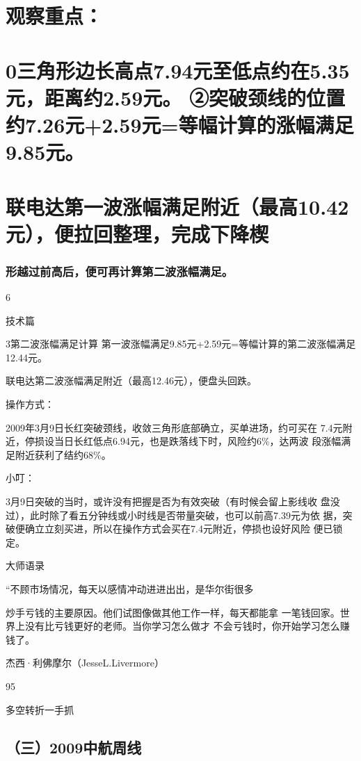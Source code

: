 \documentclass{article}
\begin{document}
\section{观察重点：}

\section{0三角形边长高点7.94元至低点约在5.35元，距离约2.59元。 ②突破颈线的位置约7.26元+2.59元=等幅计算的涨幅满足9.85元。}

\section{联电达第一波涨幅满足附近（最高10.42元），便拉回整理，完成下降楔}

\subsubsection{形越过前高后，便可再计算第二波涨幅满足。}

6

\clearpage

技术篇

3第二波涨幅满足计算 第一波涨幅满足9.85元+2.59元=等幅计算的第二波涨幅满足12.44元。

联电达第二波涨幅满足附近（最高12.46元），便盘头回跌。

操作方式：

2009年3月9日长红突破颈线，收敛三角形底部确立，买单进场，约可买在 7.4元附近，停损设当日长红低点6.94元，也是跌落线下时，风险约6\%，达两波 段涨幅满足附近获利了结约68\%。

小叮：

3月9日突破的当时，或许没有把握是否为有效突破（有时候会留上影线收 盘没过），此时除了看五分钟线或小时线是否带量突破，也可以前高7.39元为依 据，突破便确立立刻买进，所以在操作方式会买在7.4元附近，停损也设好风险 便已锁定。

大师语录

“不顾市场情况，每天以感情冲动进进出出，是华尔街很多

炒手亏钱的主要原因。他们试图像做其他工作一样，每天都能拿 一笔钱回家。世界上没有比亏钱更好的老师。当你学习怎么做才 不会亏钱时，你开始学习怎么赚钱了。

杰西·利佛摩尔（JesseL.Livermore）

95

\clearpage

多空转折一手抓

\subsection{（三）2009中航周线}
\end{document}
